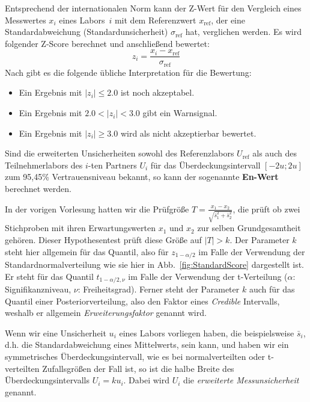 Entsprechend der internationalen Norm \cite{ISO13528} kann der Z-Wert für den Vergleich eines
Messwertes $x_{i}$ eines Labors~$i$ mit dem Referenzwert $x_\mathrm{ref}$, der eine
Standardabweichung (Standardunsicherheit) $\sigma_\mathrm{ref}$ hat, verglichen werden.
Es wird folgender Z-Score berechnet und anschließend bewertet:
\begin{equation}
 z_i = \frac{x_{i}-x_\mathrm{ref}}{\sigma_\mathrm{ref}}
\end{equation}
Nach \cite{ISO13528} gibt es die folgende übliche Interpretation für die Bewertung:
\begin{itemize}
	\item Ein Ergebnis mit $|z_i| \le 2.0$ ist noch akzeptabel.
	\item Ein Ergebnis mit $ 2.0 < |z_i| < 3.0$ gibt ein Warnsignal.
	\item Ein Ergebnis mit $|z_i| \ge 3.0 $ wird als nicht akzeptierbar bewertet.
\end{itemize}
Sind die erweiterten Unsicherheiten sowohl des Referenzlabors $U_\mathrm{ref}$ als auch
des Teilnehmerlabors des $i$-ten Partners $U_{i}$ für das
Überdeckungsintervall $[-2 u; 2 u]$ zum 95,45\% Vertrauensniveau bekannt,
so kann der sogenannte \textbf{En-Wert} berechnet werden.

In der vorigen Vorlesung hatten wir die Prüfgröße
$T = \frac{x_1 - x_2}{\sqrt{\bar s_1^2 + \bar s_2^2}}$, die prüft ob zwei Stichproben mit ihren Erwartungswerten
$x_1$ und $x_2$ zur selben Grundgesamtheit gehören.
Dieser Hypothesentest prüft diese Größe auf $|T| > k$. Der Parameter $k$ steht hier allgemein für das Quantil,
also für $z_{1-\alpha/2}$ im Falle der Verwendung der Standardnormalverteilung wie sie hier in Abb.~\ref{fig:StandardScore}
dargestellt ist. Er steht für das Quantil $t_{1-\alpha/2,\nu}$ im Falle der Verwendung der t-Verteilung ($\alpha$: Signifikanzniveau, $\nu$:
Freiheitsgrad). Ferner steht der Parameter $k$ auch für das Quantil einer Posteriorverteilung, also den Faktor
eines \textsl{Credible} Intervalls, weshalb er allgemein \textsl{Erweiterungsfaktor} genannt wird.

Wenn wir eine Unsicherheit $u_i$ eines Labors vorliegen haben, die beispielsweise $\bar s_i$, d.h. die Standardabweichung  eines Mittelwerts,
sein kann, und haben wir ein symmetrisches Überdeckungsintervall, wie es bei normalverteilten oder t-verteilten Zufallsgrößen
der Fall ist, so ist die halbe Breite des Überdeckungsintervalls $U_i = k u_i$. Dabei wird $U_i$ die \textsl{erweiterte Messunsicherheit} genannt.

